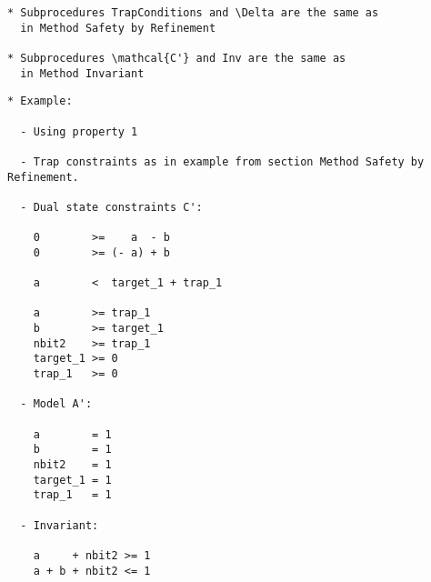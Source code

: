 \documentclass{llncs}
\begin{document}




\begin{verbatim}
* Subprocedures TrapConditions and \Delta are the same as
  in Method Safety by Refinement

* Subprocedures \mathcal{C'} and Inv are the same as
  in Method Invariant
\end{verbatim}

\newpage

\begin{verbatim}
* Example:

  - Using property 1

  - Trap constraints as in example from section Method Safety by Refinement.
  
  - Dual state constraints C':

    0        >=    a  - b
    0        >= (- a) + b

    a        <  target_1 + trap_1

    a        >= trap_1
    b        >= target_1
    nbit2    >= trap_1
    target_1 >= 0
    trap_1   >= 0

  - Model A':

    a        = 1
    b        = 1
    nbit2    = 1
    target_1 = 1
    trap_1   = 1
    
  - Invariant:

    a     + nbit2 >= 1
    a + b + nbit2 <= 1
\end{verbatim}




\end{document}
